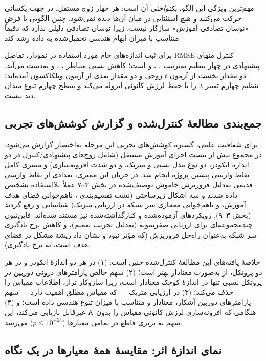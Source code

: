 مهم‌ترین ویژگی این الگو، \emph{یکنواختی} آن است: هر چهار زوج مستقل، در جهت
یکسانی حرکت می‌کنند و هیچ استثنایی در میان آن‌ها دیده نمی‌شود. چنین الگویی
با فرض «نوسان تصادفی آموزش» سازگار نیست، زیرا نوسان تصادفی دلیلی ندارد که
دقیقاً متناسب با میزان ابهام هندسی تحمیل‌شده به داده رشد کند.

برای ثبت اندازه‌های خام مورد استفاده در نمودار، تفاضل RMSE کنترل منهای پیشنهادی
در چهار تنظیم به‌ترتیب ، ،  و
 است؛ کاهش نسبی متناظر ، ،  و
 به‌دست می‌آید. دو مقدار نخست از آزمون $t$ زوجی و دو مقدار بعدی
از آزمون ویلکاکسون آمده‌اند؛ تنظیم چهارم تغییر $\lambda$ را با حفظ لرزش کانونی
ایزوله می‌کند و سطح چهارم تنوع میدان دید نیست.

\subsection{جمع‌بندی مطالعهٔ کنترل‌شده و گزارش کوشش‌های تجربی}
\label{subsec:controlled_study_summary}

برای شفافیت علمی، گسترهٔ کوشش‌های تجربی این مرحله به‌اختصار گزارش می‌شود. در مجموع بیش از بیست اجرای آموزش مستقل (شامل زوج‌های پیشنهادی/کنترل در دو اندازهٔ انکودر، دو نوع مدل نسبی و متریک، و دو شدت افزونه‌سازی) و ممیزی کامل نقاط وارسی پیشین پروژه انجام شد. در جریان این ممیزی، تعدادی از نقاط وارسی قدیمی  به‌دلیل فروریزش خاموش توصیف‌شده در بخش ۳--۷ عملاً بلااستفاده تشخیص داده شدند و سه اشکال زیرساختی (نشت تقسیم‌بندی ، ناهم‌خوانی فضای هدف آموزش، و ناهم‌خوانی معماری سر شبکه در ارزیابی متریک) شناسایی و رفع گردید (بخش ۳--۹). رویکردهای آزموده‌شده و کنارگذاشته‌شده نیز مستند شده‌اند: فاین‌تیون چندمجموعه‌ای برای ارزیابی صفرنمونه (به‌دلیل تخریب تعمیم)، و کاهش نرخ یادگیری سر شبکه به‌عنوان راه‌حل فروریزش (که مؤثر نبود و نشان داد ریشهٔ مشکل در فضای هدف است، نه نرخ یادگیری).

خلاصهٔ یافته‌های این مطالعهٔ کنترل‌شده چنین است: (۱) \proposedmodel{} در هر دو اندازهٔ انکودر و در هر دو پروتکل، از \publishedbasemodel{} به‌صورت معنادار بهتر است؛ (۲) سهم خالص پارامترهای درونی دوربین در پروتکل نسبی تنها در اندازهٔ کوچک معنادار است، زیرا سازوکار تراز، اطلاعات مقیاس را حذف می‌کند؛ (۳) در ارزیابی متریک --- که مقیاس مطلق اهمیت دارد --- سهم پارامترهای دوربین آشکار، معنادار و متناسب با میزان تنوع هندسی داده است؛ و (۴) هنگامی که افزونه‌سازی لرزش کانونی مقیاس را بدون $K$ غیرقابل بازیابی می‌کند، این سهم به برتری قاطع در تمامی معیارها ($p \le 10^{-24}$) می‌رسد.

\subsection{نمای اندازهٔ اثر: مقایسهٔ همهٔ معیارها در یک نگاه}
\label{subsec:forest_plot}

